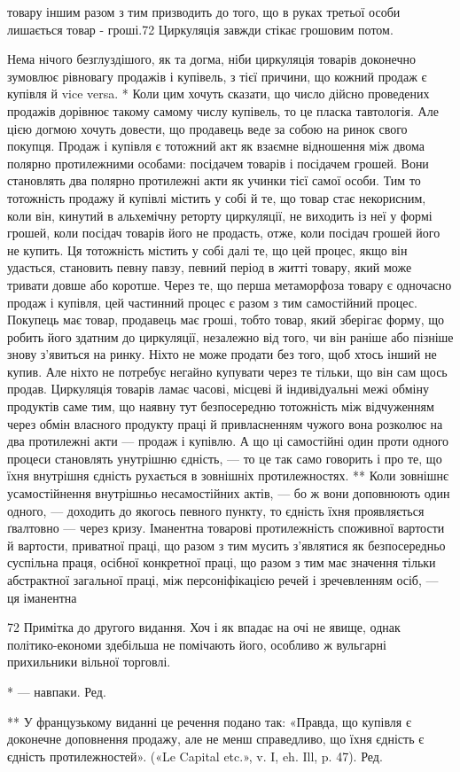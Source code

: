 товару іншим разом з тим призводить до того, що в руках третьої
особи лишається товар - гроші.72 Циркуляція завжди стікає грошовим
потом.

Нема нічого безглуздішого, як та догма, ніби циркуляція
товарів доконечно зумовлює рівновагу продажів і купівель, з
тієї причини, що кожний продаж є купівля й vice versa. * Коли
цим хочуть сказати, що число дійсно проведених продажів дорівнює
такому самому числу купівель, то це пласка тавтологія.
Але цією догмою хочуть довести, що продавець веде за собою
на ринок свого покупця. Продаж і купівля є тотожний акт як
взаємне відношення між двома полярно протилежними особами:
посідачем товарів і посідачем грошей. Вони становлять два полярно
протилежні акти як учинки тієї самої особи. Тим то тотожність
продажу й купівлі містить у собі й те, що товар стає некорисним,
коли він, кинутий в альхемічну реторту циркуляції, не
виходить із неї у формі грошей, коли посідач товарів його не продасть,
отже, коли посідач грошей його не купить. Ця тотожність
містить у собі далі те, що цей процес, якщо він удасться, становить
певну павзу, певний період в житті товару, який може тривати
довше або коротше. Через те, що перша метаморфоза товару є
одночасно продаж і купівля, цей частинний процес є разом з
тим самостійний процес. Покупець має товар, продавець має
гроші, тобто товар, який зберігає форму, що робить його здатним
до циркуляції, незалежно від того, чи він раніше або пізніше
знову з’явиться на ринку. Ніхто не може продати без того, щоб
хтось інший не купив. Але ніхто не потребує негайно купувати
через те тільки, що він сам щось продав. Циркуляція товарів
ламає часові, місцеві й індивідуальні межі обміну продуктів
саме тим, що наявну тут безпосередню тотожність між відчуженням
через обмін власного продукту праці й привласненням
чужого вона розколює на два протилежні акти — продаж і купівлю.
А що ці самостійні один проти одного процеси становлять
унутрішню єдність, — то це так само говорить і про те, що їхня
внутрішня єдність рухається в зовнішніх протилежностях. **
Коли зовнішнє усамостійнення внутрішньо несамостійних актів, —
бо ж вони доповнюють один одного, — доходить до якогось певного
пункту, то єдність їхня проявляється ґвалтовно — через
кризу. Іманентна товарові протилежність споживної вартости й
вартости, приватної праці, що разом з тим мусить з’являтися
як безпосередньо суспільна праця, осібної конкретної праці,
що разом з тим має значення тільки абстрактної загальної праці,
між персоніфікацією речей і зречевленням осіб, — ця іманентна

72    Примітка до другого видання. Хоч і як впадає на очі не явище,
однак політико-економи здебільша не помічають його, особливо ж вульгарні
прихильники вільної торговлі.

* — навпаки. Ред.

** У французькому виданні це речення подано так: «Правда, що купівля
є доконечне доповнення продажу, але не менш справедливо, що
їхня єдність є єдність протилежностей». («Le Capital etc.», v. I, eh. Ill, p. 47).
Ред.
